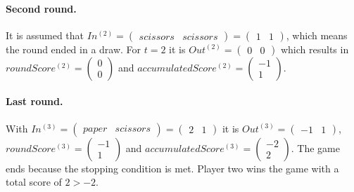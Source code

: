 \paragraph{Second round.} It is assumed that $In^{(2)}=\begin{pmatrix}
scissors&scissors
\end{pmatrix} = \begin{pmatrix}
1&1
\end{pmatrix}$, which means the round ended in a draw. For $t=2$ it is $Out^{(2)}=\begin{pmatrix}
0&0
\end{pmatrix}$ which results in  $roundScore^{(2)}=\begin{pmatrix}
0\\0
\end{pmatrix}$ and $accumulatedScore^{(2)}=\begin{pmatrix}
-1\\1
\end{pmatrix}$.

\paragraph{Last round.} With $In^{(3)}=\begin{pmatrix}
paper&scissors
\end{pmatrix} = \begin{pmatrix}
2&1
\end{pmatrix}$ it is $Out^{(3)}=\begin{pmatrix}
-1&1
\end{pmatrix}$, \newline $roundScore^{(3)}=\begin{pmatrix}
-1\\1
\end{pmatrix}$ and $accumulatedScore^{(3)}=\begin{pmatrix}
-2\\2
\end{pmatrix}$. The game ends because the stopping condition is met. Player two wins the game with a total score of $2 > -2$.